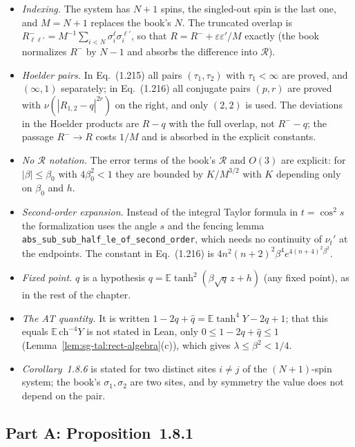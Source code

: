 \begin{remark}
\label{rem:sg-tal:dev-18}
\begin{itemize}
\item \emph{Indexing.}  The system has $N+1$ spins, the singled-out spin is the last one, and $M=N+1$ replaces the book's $N$.  The truncated overlap is $R^-_{\ell\ell'}=M^{-1}\sum_{i<N}\sigma^\ell_i\sigma^{\ell'}_i$, so that $R=R^-+\varepsilon\varepsilon'/M$ exactly (the book normalizes $R^-$ by $N-1$ and absorbs the difference into $\mathcal R$).
\item \emph{Hoelder pairs.}  In Eq.~(1.215) all pairs $(\tau_1,\tau_2)$ with $\tau_1<\infty$ are proved, and $(\infty,1)$ separately; in Eq.~(1.216) all conjugate pairs $(p,r)$ are proved with $\nu(|R_{1,2}-q|^{2r})$ on the right, and only $(2,2)$ is used.  The deviations in the Hoelder products are $R-q$ with the full overlap, not $R^--q$; the passage $R^-\to R$ costs $1/M$ and is absorbed in the explicit constants.
\item \emph{No $\mathcal R$ notation.}  The error terms of the book's $\mathcal R$ and $O(3)$ are explicit: for $|\beta|\le\beta_0$ with $4\beta_0^2<1$ they are bounded by $K/M^{3/2}$ with $K$ depending only on $\beta_0$ and $h$.
\item \emph{Second-order expansion.}  Instead of the integral Taylor formula in $t=\cos^2s$ the formalization uses the angle $s$ and the fencing lemma \texttt{abs\_sub\_sub\_half\_le\_of\_second\_order}, which needs no continuity of $\nu_t'$ at the endpoints.  The constant in Eq.~(1.216) is $4n^2(n+2)^2\beta^4e^{4(n+4)^2\beta^2}$.
\item \emph{Fixed point.}  $q$ is a hypothesis $q=\mathbb E\tanh^2(\beta\sqrt q\,z+h)$ (any fixed point), as in the rest of the chapter.
\item \emph{The AT quantity.}  It is written $1-2q+\hat q=\mathbb E\tanh^4Y-2q+1$; that this equals $\mathbb E\,\mathrm{ch}^{-4}Y$ is not stated in Lean, only $0\le1-2q+\hat q\le1$ (Lemma~\ref{lem:sg-tal:rect-algebra}(c)), which gives $\lambda\le\beta^2<1/4$.
\item \emph{Corollary~1.8.6} is stated for two distinct sites $i\ne j$ of the $(N+1)$-spin system; the book's $\sigma_1,\sigma_2$ are two sites, and by symmetry the value does not depend on the pair.
\end{itemize}
\end{remark}

\subsection{Part A: Proposition~1.8.1}

